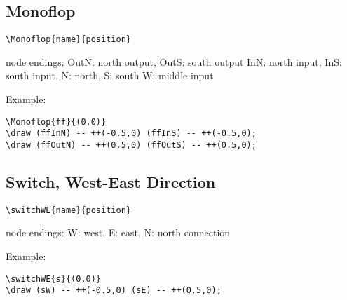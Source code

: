 \documentclass[parskip=full]{scrartcl}
\begin{document}
\subsection{Monoflop}

\begin{verbatim}
\Monoflop{name}{position}
\end{verbatim}
node endings: OutN: north output, OutS: south output
              InN: north input, InS: south input,
              N: north, S: south
              W: middle input

Example:\\
\begin{minipage}{0.8\textwidth}
\begin{verbatim}
\Monoflop{ff}{(0,0)}
\draw (ffInN) -- ++(-0.5,0) (ffInS) -- ++(-0.5,0);
\draw (ffOutN) -- ++(0.5,0) (ffOutS) -- ++(0.5,0);
\end{verbatim}
\end{minipage}
\begin{minipage}{0.19\textwidth}
\end{minipage}

\subsection{Switch, West-East Direction}

\begin{verbatim}
\switchWE{name}{position}
\end{verbatim}
node endings: W: west, E: east, N: north connection

Example:\\
\begin{minipage}{0.8\textwidth}
\begin{verbatim}
\switchWE{s}{(0,0)}
\draw (sW) -- ++(-0.5,0) (sE) -- ++(0.5,0);
\end{verbatim}
\end{minipage}
\begin{minipage}{0.19\textwidth}
\end{minipage}
\end{document}
